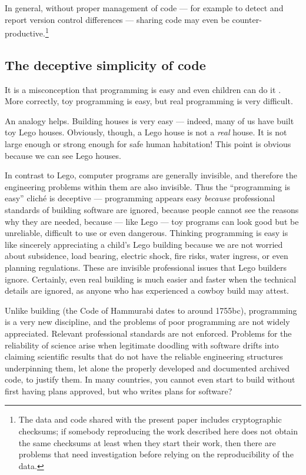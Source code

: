 \documentclass{comjnl}
\begin{document}
\begin{change}
In general, without proper management of code --- for example to detect and report version control differences --- sharing code may even be counter-productive.\footnote{The data and code shared with the present paper includes cryptographic checksums; if somebody reproducing the work described here does not obtain the same checksums at least when they start their work, then there are problems that need investigation before relying on the reproducibility of the data.}

\subsection{The deceptive simplicity of code}\label{deceptive-simplicity-of-code}
It is a misconception that programming is easy and even children can do it \cite{fixit}. More correctly, toy programming is easy, but real programming is very difficult.

An analogy helps. Building houses is very easy --- indeed, many of us have built toy Lego houses. Obviously, though, a Lego house is not a \emph{real\/} house. It is not large enough or strong enough for safe human habitation! This point is obvious because we can see Lego houses. 

In contrast to Lego, computer programs are generally invisible, and therefore the engineering problems within them are also invisible. Thus the ``programming is easy'' clich\' e is deceptive --- programming appears easy \emph{because\/} professional standards of building software are ignored, because people cannot see the reasons why they are needed, because --- like Lego --- toy programs can look good but be unreliable, difficult to use or even dangerous. Thinking programming is easy is like sincerely appreciating a child's Lego building because we are not worried about subsidence, load bearing, electric shock, fire risks, water ingress, or even planning regulations. These are invisible professional issues that Lego builders ignore. Certainly, even real building is much easier and faster when the technical details are ignored, as anyone who has experienced a cowboy build may attest.

Unlike building (the Code of Hammurabi dates to around 1755{\sc bc}), programming is a very new discipline, and the problems of poor programming are not widely appreciated. Relevant professional standards are not enforced. Problems for the reliability of science arise when legitimate doodling with software drifts into claiming scientific results that do not have the reliable engineering structures underpinning them, let alone the properly developed and documented archived code, to justify them. In many countries, you cannot even start to build without first having plans approved, but who writes plans for software?


\end{change}
\end{document}
